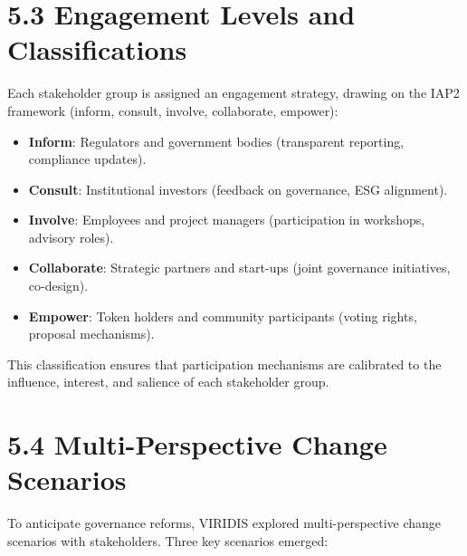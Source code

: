\documentclass[
  english,
  12pt,
  oneside,
  open=any]{scrbook}
\providecommand{\tightlist}{%
  \setlength{\itemsep}{0pt}\setlength{\parskip}{0pt}}\usepackage{longtable,booktabs,array}
\begin{document}
\section{5.3 Engagement Levels and
Classifications}\label{sec-engage-levels}

Each stakeholder group is assigned an engagement strategy, drawing on
the IAP2 framework (inform, consult, involve, collaborate, empower):

\begin{itemize}
\tightlist
\item
  \textbf{Inform}: Regulators and government bodies (transparent
  reporting, compliance updates).\\
\item
  \textbf{Consult}: Institutional investors (feedback on governance, ESG
  alignment).\\
\item
  \textbf{Involve}: Employees and project managers (participation in
  workshops, advisory roles).\\
\item
  \textbf{Collaborate}: Strategic partners and start-ups (joint
  governance initiatives, co-design).\\
\item
  \textbf{Empower}: Token holders and community participants (voting
  rights, proposal mechanisms).
\end{itemize}

This classification ensures that participation mechanisms are calibrated
to the influence, interest, and salience of each stakeholder group.

\section{5.4 Multi-Perspective Change Scenarios}\label{sec-scenarios}

To anticipate governance reforms, VIRIDIS explored multi-perspective
change scenarios with stakeholders. Three key scenarios emerged:
\end{document}
